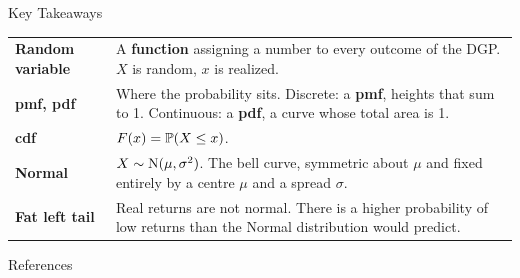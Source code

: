 \documentclass[9pt,english,aspectratio=169]{beamer}
\begin{document}
\begin{frame}{Key Takeaways}

  \vspace{0.3em}
  \begin{tabular}{@{} l p{9.6cm} @{}}
    \textbf{Random variable} & A \textbf{function} assigning a number to every
      outcome of the DGP. $X$ is random, $x$ is realized. \\[0.55em]
    \textbf{pmf, pdf} & Where the probability sits. Discrete: a \textbf{pmf},
      heights that sum to 1. Continuous: a \textbf{pdf}, a curve whose total
      area is 1. \\[0.55em]
    \textbf{cdf} & $F(x) = \mathbb{P}(X \leq x)$.  \\[0.55em]
    \textbf{Normal} & $X \sim \mathrm{N}(\mu, \sigma^2)$. The bell curve, symmetric
      about $\mu$ and fixed entirely by a centre $\mu$ and a spread $\sigma$. \\[0.55em]
    \textbf{Fat left tail} & Real returns are not normal. There is a higher probability of low returns than the Normal distribution would predict. \\
  \end{tabular}

\end{frame}


\begin{frame}{References}
  \footnotesize
  \nocite{Shiller2024_data}
  
\end{frame}


\appendix

\end{document}
